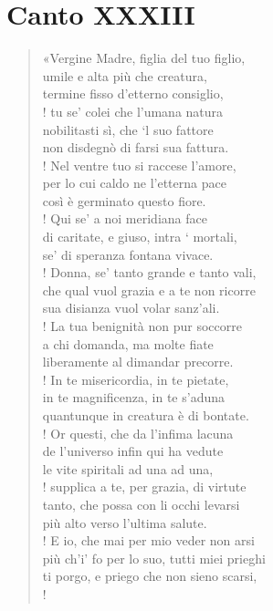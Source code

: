 \documentclass[a4paper, twoside, titlepage]{book}
\begin{document}
\chapter{Canto XXXIII}

\begin{verse}
«Vergine Madre, figlia del tuo figlio,\\
umile e alta più che creatura,\\
termine fisso d’etterno consiglio,\\!
tu se’ colei che l’umana natura\\
nobilitasti sì, che ‘l suo fattore\\
non disdegnò di farsi sua fattura.\\!
Nel ventre tuo si raccese l’amore,\\
per lo cui caldo ne l’etterna pace\\
così è germinato questo fiore.\\!
Qui se’ a noi meridiana face\\
di caritate, e giuso, intra ‘ mortali,\\
se’ di speranza fontana vivace.\\!
Donna, se’ tanto grande e tanto vali,\\
che qual vuol grazia e a te non ricorre\\
sua disianza vuol volar sanz’ali.\\!
La tua benignità non pur soccorre\\
a chi domanda, ma molte fiate\\
liberamente al dimandar precorre.\\!
In te misericordia, in te pietate,\\
in te magnificenza, in te s’aduna\\
quantunque in creatura è di bontate.\\!
Or questi, che da l’infima lacuna\\
de l’universo infin qui ha vedute\\
le vite spiritali ad una ad una,\\!
supplica a te, per grazia, di virtute\\
tanto, che possa con li occhi levarsi\\
più alto verso l’ultima salute.\\!
E io, che mai per mio veder non arsi\\
più ch’i’ fo per lo suo, tutti miei prieghi\\
ti porgo, e priego che non sieno scarsi,\\!

\end{verse}
\end{document}
